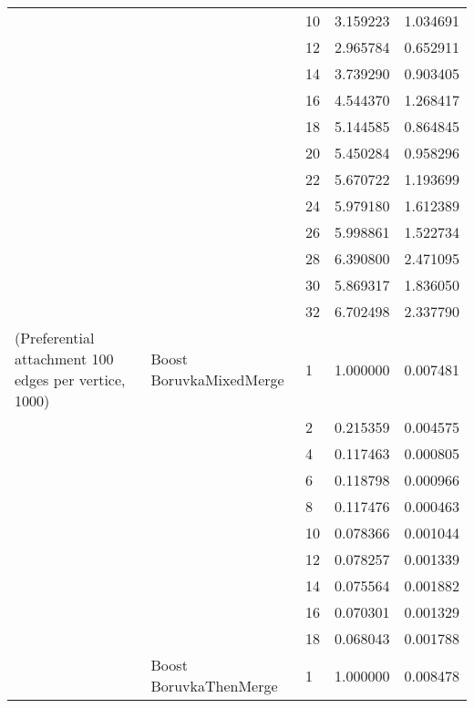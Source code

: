\begin{tabular}{lllrr}
                      &                     & 10 &  3.159223 &  1.034691 \\
                      &                     & 12 &  2.965784 &  0.652911 \\
                      &                     & 14 &  3.739290 &  0.903405 \\
                      &                     & 16 &  4.544370 &  1.268417 \\
                      &                     & 18 &  5.144585 &  0.864845 \\
                      &                     & 20 &  5.450284 &  0.958296 \\
                      &                     & 22 &  5.670722 &  1.193699 \\
                      &                     & 24 &  5.979180 &  1.612389 \\
                      &                     & 26 &  5.998861 &  1.522734 \\
                      &                     & 28 &  6.390800 &  2.471095 \\
                      &                     & 30 &  5.869317 &  1.836050 \\
                      &                     & 32 &  6.702498 &  2.337790 \\
(Preferential attachment 100 edges per vertice, 1000) & Boost BoruvkaMixedMerge & 1  &  1.000000 &  0.007481 \\
                      &                     & 2  &  0.215359 &  0.004575 \\
                      &                     & 4  &  0.117463 &  0.000805 \\
                      &                     & 6  &  0.118798 &  0.000966 \\
                      &                     & 8  &  0.117476 &  0.000463 \\
                      &                     & 10 &  0.078366 &  0.001044 \\
                      &                     & 12 &  0.078257 &  0.001339 \\
                      &                     & 14 &  0.075564 &  0.001882 \\
                      &                     & 16 &  0.070301 &  0.001329 \\
                      &                     & 18 &  0.068043 &  0.001788 \\
                      & Boost BoruvkaThenMerge & 1  &  1.000000 &  0.008478 \\

\end{tabular}
